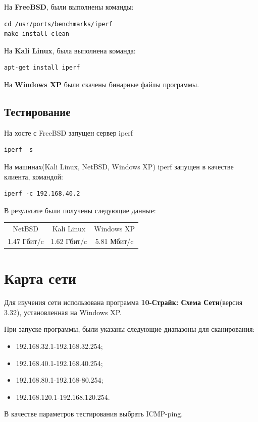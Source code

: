 \documentclass[14pt,a4paper,report]{report}
\begin{document}
На \textbf{FreeBSD}, были выполнены команды:
\begin{lstlisting}[language={}]
cd /usr/ports/benchmarks/iperf
make install clean
\end{lstlisting}
На \textbf{Kali Linux}, была выполнена команда:
\begin{lstlisting}[language={}]
apt-get install iperf
\end{lstlisting}
На \textbf{Windows XP} были скачены бинарные файлы программы.

\subsection{Тестирование}
На хосте с FreeBSD запущен сервер iperf
\begin{lstlisting}[language={}]
iperf -s
\end{lstlisting}
На машинах(Kali Linux, NetBSD, Windows XP) iperf запущен в качестве клиента, командой:
\begin{lstlisting}[language={}]
iperf -c 192.168.40.2
\end{lstlisting}
В результате были получены следующие данные:


\begin{center}
\begin{tabular}{ c c c }
NetBSD & Kali Linux & Windows XP\\ 
1.47 Гбит/c & 1.62 Гбит/c & 5.81 Мбит/c\\ 
\end{tabular}
\end{center}

\section{Карта сети}
Для изучения сети использована программа \textbf{10-Страйк: Схема Сети}(версия 3.32), установленная на Windows XP.

При запуске программы, были указаны следующие диапазоны для сканирования:
\begin{itemize}
\item 192.168.32.1-192.168.32.254;
\item 192.168.40.1-192.168.40.254;
\item 192.168.80.1-192.168-80.254;
\item 192.168.120.1-192.168.120.254.
\end{itemize}
В качестве параметров тестирования выбрать ICMP-ping. 
\end{document}

